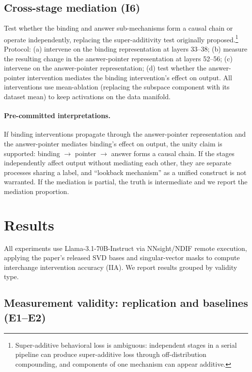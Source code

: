 \documentclass[11pt]{article}
\begin{document}
\subsection{Cross-stage mediation (I6)}
\label{sec:mediation}

Test whether the binding and answer sub-mechanisms form a causal chain or operate independently, replacing the super-additivity test originally proposed.\footnote{Super-additive behavioral loss is ambiguous: independent stages in a serial pipeline can produce super-additive loss through off-distribution compounding, and components of one mechanism can appear additive.} Protocol: (a) intervene on the binding representation at layers 33--38; (b) measure the resulting change in the answer-pointer representation at layers 52--56; (c) intervene on the answer-pointer representation; (d) test whether the answer-pointer intervention mediates the binding intervention's effect on output. All interventions use mean-ablation (replacing the subspace component with its dataset mean) to keep activations on the data manifold.

\paragraph{Pre-committed interpretations.} If binding interventions propagate through the answer-pointer representation and the answer-pointer mediates binding's effect on output, the unity claim is supported: binding $\to$ pointer $\to$ answer forms a causal chain. If the stages independently affect output without mediating each other, they are separate processes sharing a label, and ``lookback mechanism'' as a unified construct is not warranted. If the mediation is partial, the truth is intermediate and we report the mediation proportion.


\section{Results}
\label{sec:results}

All experiments use Llama-3.1-70B-Instruct via NNsight/NDIF remote execution, applying the paper's released SVD bases and singular-vector masks to compute interchange intervention accuracy (IIA). We report results grouped by validity type.

\subsection{Measurement validity: replication and baselines (E1--E2)}
\end{document}
